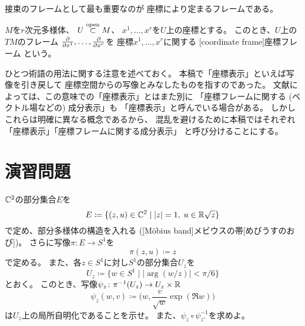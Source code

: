 \documentclass[report]{jlreq}
\begin{document}
接束のフレームとして最も重要なのが
座標により定まるフレームである。

\begin{definition}[座標フレーム]
    $M$を$r$次元多様体、
    $U \stackrel{\text{open}}{\subset} M$、
    $x^1, \dots, x^r$を$U$上の座標とする。
    このとき、$U$上の$TM$のフレーム
    $\deldel{x^1}, \dots, \deldel{x^r}$を
    座標$x^1, \dots, x^r$に関する
    [coordinate frame]{座標フレーム}
    という。
\end{definition}

\begin{remark}[座標表示と座標フレームに関する成分表示]
    ひとつ術語の用法に関する注意を述べておく。
    本稿で「座標表示」といえば\smooth 写像を引き戻して
    座標空間からの写像とみなしたものを指すのであった。
    文献によっては、この意味での「座標表示」とはまた別に
    「座標フレームに関する (ベクトル場などの) 成分表示」も
    「座標表示」と呼んでいる場合がある。
    しかしこれらは明確に異なる概念であるから、
    混乱を避けるために本稿ではそれぞれ
    「座標表示」「座標フレームに関する成分表示」
    と呼び分けることにする。
\end{remark}


%
\newpage
\section{演習問題}

\begin{problem}
    $\mathbb{C}^2$の部分集合$E$を
    \begin{equation}
        E \coloneqq \{
            (z, u) \in \mathbb{C}^2 \mid |z| = 1, \; u \in \mathbb{R} \sqrt{z}
        \}
    \end{equation}
    で定め、部分多様体の構造を入れる
    ([M\"{o}bius band]{メビウスの帯}[めびうすのおび])。
    さらに写像$\pi \colon E \to S^1$を
    \begin{equation}
        \pi(z, u) \coloneqq z
    \end{equation}
    で定める。
    また、各$z \in S^1$に対し$S^1$の部分集合$U_z$を
    \begin{equation}
        U_z \coloneqq \{
            w \in S^1
            \mid
            |\arg(w / z)| < \pi / 6
        \}
    \end{equation}
    とおく。
    このとき、写像$\psi_z \colon \pi^{-1}(U_z) \to U_z \times \mathbb{R}$
    \begin{equation}
        \psi_z(w, v) \coloneqq \biggl( w, \frac{v}{\sqrt{w}} \exp(\Re w) \biggr)
    \end{equation}
    は$U_z$上の局所自明化であることを示せ。
    また、$\psi_z \circ \psi_{z'}^{-1}$を求めよ。
\end{problem}
\end{document}
